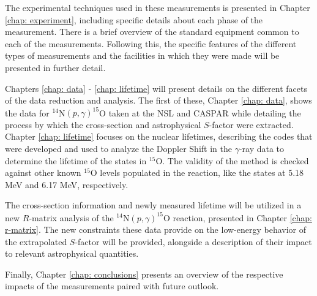 The experimental techniques used in these measurements is presented in Chapter \ref{chap: experiment}, including specific details about each phase of the measurement. There is a brief overview of the standard equipment common to each of the measurements. Following this, the specific features of the different types of measurements and the facilities in which they were made will be presented in further detail. 

Chapters \ref{chap: data} - \ref{chap: lifetime} will present details on the different facets of the data reduction and analysis. The first of these, Chapter \ref{chap: data}, shows the data for $^{14}$N$\left( p,\gamma \right) ^{15}$O taken at the NSL and CASPAR while detailing the process by which the cross-section and astrophysical $S$-factor were extracted. Chapter \ref{chap: lifetime} focuses on the nuclear lifetimes, describing the codes that were developed and used to analyze the Doppler Shift in the $\gamma$-ray data to determine the lifetime of the states in $^{15}$O. The validity of the method is checked against other known $^{15}$O levels populated in the reaction, like the states at 5.18 MeV and 6.17 MeV, respectively.

The cross-section information and newly measured lifetime will be utilized in a new $R$-matrix analysis of the $^{14}$N$\left( p,\gamma \right) ^{15}$O reaction, presented in Chapter \ref{chap: r-matrix}. The new constraints these data provide on the low-energy behavior of the extrapolated $S$-factor will be provided, alongside a description of their impact to relevant astrophysical quantities.

Finally, Chapter \ref{chap: conclusions} presents an overview of the respective impacts of the measurements paired with future outlook. 

%
% 
% 

